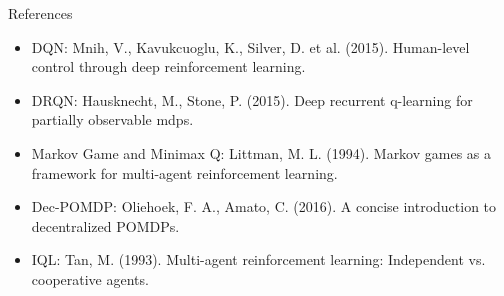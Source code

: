 \documentclass[9pt, hyperref={pdfusetitle,colorlinks=true,allcolors=DarkBlue}]{beamer}
\begin{document}
\begin{frame}[plain]{}
\end{frame}


\begin{frame}{References}
\begin{itemize}
    \item DQN: Mnih, V., Kavukcuoglu, K., Silver, D. et al. (2015). Human-level control through deep reinforcement learning.
    \item DRQN: Hausknecht, M., Stone, P. (2015). Deep recurrent q-learning for partially observable mdps.
    \item Markov Game and Minimax Q: Littman, M. L. (1994). Markov games as a framework for multi-agent reinforcement learning.
    \item Dec-POMDP: Oliehoek, F. A., Amato, C. (2016). A concise introduction to decentralized POMDPs.
    \item IQL: Tan, M. (1993). Multi-agent reinforcement learning: Independent vs. cooperative agents.
\end{itemize}
\end{frame}
\end{document}
